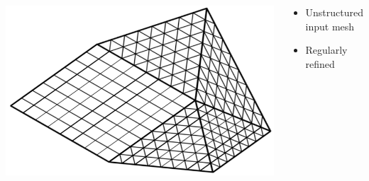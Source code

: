 \documentclass[t,compress=false,usepdftitle=false]{beamer}
\begin{document}
\begin{frame}
\begin{columns}
\centering\includegraphics[height=0.4\textheight]{SemiStructuredGrid.png}\\
\vspace{3mm}
\begin{myColorBox}{.9}{}\color{linkcolor}
\centering
\begin{itemize}
 \item Unstructured input mesh
 \item Regularly refined
\end{itemize}
\end{myColorBox}
\end{columns}
\end{frame}
\end{document}
